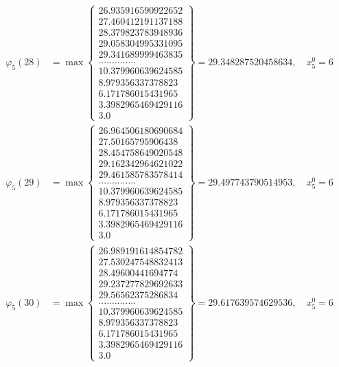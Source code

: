 \documentclass{article}
\begin{document}
\begin{align*}
  
  
  
\varphi_{5}(28) &= \max \left\{ \begin{array}{c}
26.935916590922652 \\
 27.460412191137188 \\
 28.379823783948936 \\
 29.058304995331095 \\
 29.341689999463835 \\
 .............. \\
 10.379960639624585 \\
 8.979356337378823 \\
 6.171786015431965 \\
 3.3982965469429116 \\
 3.0
\end{array} \right\} = 29.348287520458634, \quad x_{5}^0 = 6\\
  
  
  
  
\varphi_{5}(29) &= \max \left\{ \begin{array}{c}
26.964506180690684 \\
 27.50165795906438 \\
 28.454758649020548 \\
 29.162342964621022 \\
 29.461585783578414 \\
 .............. \\
 10.379960639624585 \\
 8.979356337378823 \\
 6.171786015431965 \\
 3.3982965469429116 \\
 3.0
\end{array} \right\} = 29.497743790514953, \quad x_{5}^0 = 6\\
  
  
  
  
\varphi_{5}(30) &= \max \left\{ \begin{array}{c}
26.989191614854782 \\
 27.530247548832413 \\
 28.49600441694774 \\
 29.237277829692633 \\
 29.56562375286834 \\
 .............. \\
 10.379960639624585 \\
 8.979356337378823 \\
 6.171786015431965 \\
 3.3982965469429116 \\
 3.0
\end{array} \right\} = 29.617639574629536, \quad x_{5}^0 = 6\\
  

\end{align*}
\end{document}
